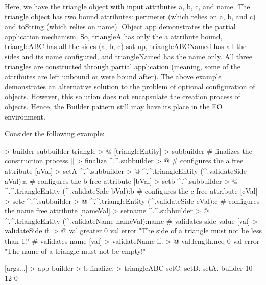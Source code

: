 \documentclass[12pt]{book}
\begin{document}
Here, we have the triangle object with input attributes a, b, c, and name. The triangle object has two bound attributes: perimeter (which relies on a, b, and c) and toString (which relies on name). Object app demonstrates the partial application mechanism. So, triangleA has only the a attribute bound, triangleABC has all the sides (a, b, c) sat up, triangleABCNamed has all the sides and its name configured, and triangleNamed has the name only. All three triangles are constructed through partial application (meaning, some of the attributes are left unbound or were bound after). The above example demonstrates an alternative solution to the problem of optional configuration of objects. However, this solution does not encapsulate the creation process of objects. Hence, the Builder pattern still may have its place in the EO environment.

Consider the following example:

\begin{ffcode}
[] > builder
  subbuilder triangle > @
  [triangleEntity] > subbuilder
    # finalizes the construction process
    [] > finalize
      ^.^.subbuilder > @
    # configures the a free attribute
    [aVal] > setA
      ^.^.subbuilder > @
        ^.^.triangleEntity
          (^.validateSide aVal):a
    # configures the b free attribute
    [bVal] > setb
      ^.^.subbuilder > @
        ^.^.triangleEntity
          (^.validateSide bVal):b
    # configures the c free attribute
    [cVal] > setc
      ^.^.subbuilder > @
        ^.^.triangleEntity
          (^.validateSide cVal):c
    # configures the name free attribute
    [nameVal] > setname
      ^.^.subbuilder > @
        ^.^.triangleEntity
          (^.validateName nameVal):name
    # validates side value
    [val] > validateSide
      if. > @
        val.greater 0
        val
        error
          "The side of a triangle must not 
          be less than 1!"
    # validates name
    [val] > validateName
      if. > @
        val.length.neq 0
        val
        error
          "The name of a triangle must not
          be empty!"

[args...] > app
  builder > b
  finalize. > triangleABC
    setC.
      setB.
        setA.
          builder
          10
        12
      0

\end{ffcode}
\end{document}
